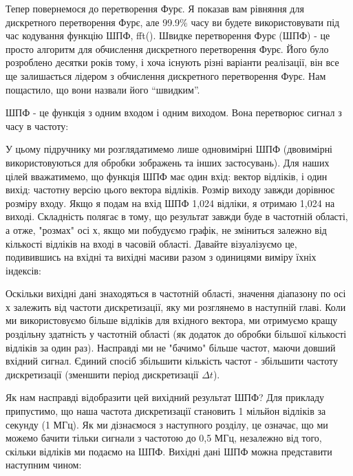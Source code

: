 Тепер повернемося до перетворення Фур\textquotesingle є. Я показав вам
рівняння для дискретного перетворення Фур\textquotesingle є, але 99.9\%
часу ви будете використовувати під час кодування функцію ШПФ, fft().
Швидке перетворення Фур\textquotesingle є (ШПФ) - це просто алгоритм для
обчислення дискретного перетворення Фур\textquotesingle є. Його було
розроблено десятки років тому, і хоча існують різні варіанти реалізації,
він все ще залишається лідером з обчислення дискретного перетворення
Фур\textquotesingle є. Нам пощастило, що вони назвали його ``швидким''.

ШПФ - це функція з одним входом і одним виходом. Вона перетворює сигнал
з часу в частоту:

\href{../_images/fft-block-diagram.svg}{}

У цьому підручнику ми розглядатимемо лише одновимірні ШПФ (двовимірні
використовуються для обробки зображень та інших застосувань). Для наших
цілей вважатимемо, що функція ШПФ має один вхід: вектор відліків, і один
вихід: частотну версію цього вектора відліків. Розмір виходу завжди
дорівнює розміру входу. Якщо я подам на вхід ШПФ 1,024 відліки, я
отримаю 1,024 на виході. Складність полягає в тому, що результат завжди
буде в частотній області, а отже, "розмах" осі х, якщо ми побудуємо
графік, не зміниться залежно від кількості відліків на вході в часовій
області. Давайте візуалізуємо це, подивившись на вхідні та вихідні
масиви разом з одиницями виміру їхніх індексів:

\href{../_images/fft-io.svg}{}

Оскільки вихідні дані знаходяться в частотній області, значення
діапазону по осі х залежить від частоти дискретизації, яку ми розглянемо
в наступній главі. Коли ми використовуємо більше відліків для вхідного
вектора, ми отримуємо кращу роздільну здатність у частотній області (як
додаток до обробки більшої кількості відліків за один раз). Насправді ми
не "бачимо" більше частот, маючи довший вхідний сигнал. Єдиний спосіб
збільшити кількість частот - збільшити частоту дискретизації (зменшити
період дискретизації \(\Delta t\)).

Як нам насправді відобразити цей вихідний результат ШПФ? Для прикладу
припустимо, що наша частота дискретизації становить 1 мільйон відліків
за секунду (1 МГц). Як ми дізнаємося з наступного розділу, це означає,
що ми можемо бачити тільки сигнали з частотою до 0,5 МГц, незалежно від
того, скільки відліків ми подаємо на ШПФ. Вихідні дані ШПФ можна
представити наступним чином:

